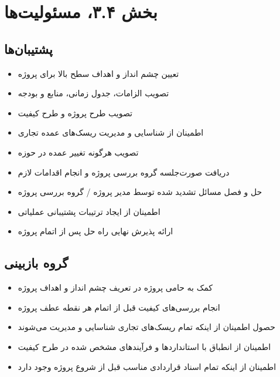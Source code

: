\chapter{بخش ۳.۴، مسئولیت‌ها}\label{resp}

\section{پشتیبان‌ها}
\begin{itemize}
\item تعیین چشم انداز و اهداف سطح بالا برای پروژه
\item تصویب الزامات، جدول زمانی، منابع و بودجه
\item تصویب طرح پروژه و طرح کیفیت
\item اطمینان از شناسایی و مدیریت ریسک‌های عمده تجاری
\item تصویب هرگونه تغییر عمده در حوزه
\item دریافت صورت‌جلسه گروه بررسی پروژه و انجام اقدامات لازم
\item حل و فصل مسائل تشدید شده توسط مدیر پروژه / گروه بررسی پروژه
\item اطمینان از ایجاد ترتیبات پشتیبانی عملیاتی
\item ارائه پذیرش نهایی راه حل پس از اتمام پروژه
\end{itemize}

\section{گروه بازبینی}
\begin{itemize}
\item کمک به حامی پروژه در تعریف چشم انداز و اهداف پروژه
\item انجام بررسی‌های کیفیت قبل از اتمام هر نقطه عطف پروژه
\item حصول اطمینان از اینکه تمام ریسک‌های تجاری شناسایی و مدیریت می‌شوند
\item اطمینان از انطباق با استانداردها و فرآیندهای مشخص شده در طرح کیفیت
\item اطمینان از اینکه تمام اسناد قراردادی مناسب قبل از شروع پروژه وجود دارد
\end{itemize}

